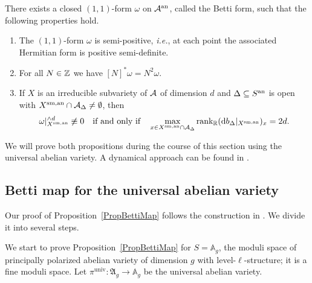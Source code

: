 \begin{proposition}\label{PropBettiForm}
There exists a closed $(1,1)$-form $\omega$ on ${\mathcal{A}}^{\mathrm{an}}$, called the Betti form, such that the following properties hold.
\begin{enumerate}
\item[(i)] The $(1,1)$-form $\omega$ is semi-positive, \textit{i.e.},  at each point
the associated Hermitian form is positive semi-definite.
\item[(ii)] For all $N\in{\mathbb{Z}}$ we have $[N]^*\omega = N^2 \omega$.
\item[(iii)] If $X$ is an irreducible subvariety of $\mathcal{A}$ of dimension
$d$ and $\Delta\subseteq {S}^{\mathrm{an}}$ is open with ${X}^{\mathrm{sm,an}}\cap\mathcal{A}_\Delta\not=\emptyset$, then
\[
\omega|_{\sman{X}}^{\wedge d} \not\equiv 0 \quad\text{if and only
if}\quad  \max_{x \in
\sman{X} \cap \cA_{\Delta}} \mathrm{rank}_{\IR}
(\mathrm{d}b_{\Delta}|_{X^{\mathrm{sm,an}}})_x = 2d. %
\]

\end{enumerate}
\end{proposition}


We will prove both propositions during the course of this section using the universal abelian variety. A dynamical approach can be found in \cite[$\mathsection$2]{CGHX:18}.

\subsection{Betti map for the universal abelian variety}\label{SubsectionBettiMap}
Our proof of Proposition~\ref{PropBettiMap} follows the construction in \cite[$\mathsection$3-$\mathsection$4]{GaoBettiRank}. We divide it into several steps.

We start to prove Proposition~\ref{PropBettiMap} for $S = \mathbb
A_g$, the moduli space of principally polarized abelian variety of
dimension $g$ with level-$\ell$-structure;  it is a fine moduli
space. Let $\pi^{\mathrm{univ}} \colon \mathfrak{A}_g \rightarrow \mathbb A_g$ be the universal abelian variety.

